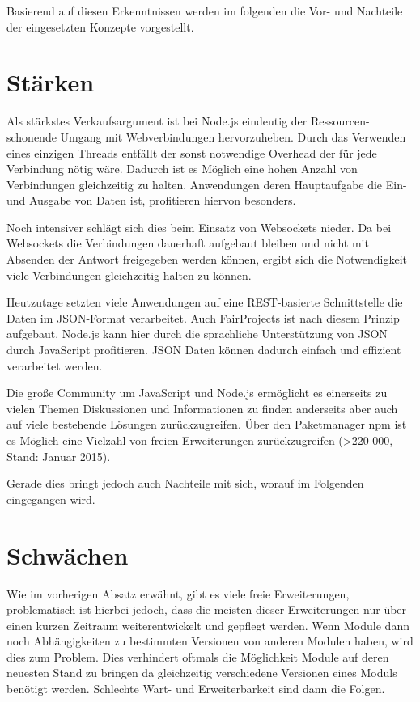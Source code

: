 Basierend auf diesen Erkenntnissen werden im folgenden die Vor- und
Nachteile der eingesetzten Konzepte vorgestellt.

\section{Stärken}\label{stuxe4rken}

Als stärkstes Verkaufsargument ist bei Node.js eindeutig der
Ressourcen-schonende Umgang mit Webverbindungen hervorzuheben. Durch das
Verwenden eines einzigen Threads entfällt der sonst notwendige Overhead
der für jede Verbindung nötig wäre. Dadurch ist es Möglich eine hohen
Anzahl von Verbindungen gleichzeitig zu halten. Anwendungen deren
Hauptaufgabe die Ein- und Ausgabe von Daten ist, profitieren hiervon
besonders.

Noch intensiver schlägt sich dies beim Einsatz von Websockets nieder. Da
bei Websockets die Verbindungen dauerhaft aufgebaut bleiben und nicht
mit Absenden der Antwort freigegeben werden können, ergibt sich die
Notwendigkeit viele Verbindungen gleichzeitig halten zu können.

Heutzutage setzten viele Anwendungen auf eine REST-basierte
Schnittstelle die Daten im JSON-Format verarbeitet. Auch FairProjects
ist nach diesem Prinzip aufgebaut. Node.js kann hier durch die
sprachliche Unterstützung von JSON durch JavaScript profitieren. JSON
Daten können dadurch einfach und effizient verarbeitet werden.

Die große Community um JavaScript und Node.js ermöglicht es einerseits
zu vielen Themen Diskussionen und Informationen zu finden anderseits
aber auch auf viele bestehende Lösungen zurückzugreifen. Über den
Paketmanager npm ist es Möglich eine Vielzahl von freien Erweiterungen
zurückzugreifen (\textgreater{}220 000, Stand: Januar 2015).

Gerade dies bringt jedoch auch Nachteile mit sich, worauf im Folgenden
eingegangen wird.

\section{Schwächen}\label{schwuxe4chen}

Wie im vorherigen Absatz erwähnt, gibt es viele freie Erweiterungen,
problematisch ist hierbei jedoch, dass die meisten dieser Erweiterungen
nur über einen kurzen Zeitraum weiterentwickelt und gepflegt werden.
Wenn Module dann noch Abhängigkeiten zu bestimmten Versionen von anderen
Modulen haben, wird dies zum Problem. Dies verhindert oftmals die
Möglichkeit Module auf deren neuesten Stand zu bringen da gleichzeitig
verschiedene Versionen eines Moduls benötigt werden. Schlechte Wart- und
Erweiterbarkeit sind dann die Folgen.

